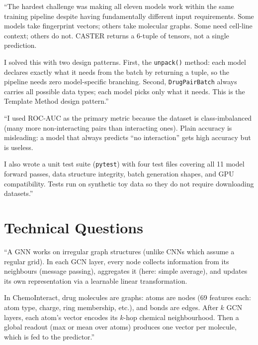 \documentclass[12pt,a4paper,oneside]{book}
\begin{document}
\begin{tcolorbox}[questionbox,title={Q2: What was your biggest technical challenge?}]
\end{tcolorbox}
\begin{tcolorbox}[answerbox]
``The hardest challenge was making all eleven models work within the same training pipeline despite having fundamentally different input requirements. Some models take fingerprint vectors; others take molecular graphs. Some need cell-line context; others do not. CASTER returns a 6-tuple of tensors, not a single prediction.

I solved this with two design patterns. First, the \texttt{unpack()} method: each model declares exactly what it needs from the batch by returning a tuple, so the pipeline needs zero model-specific branching. Second, \texttt{DrugPairBatch} always carries all possible data types; each model picks only what it needs. This is the Template Method design pattern.''
\end{tcolorbox}

\begin{tcolorbox}[questionbox,title={Q3: How did you validate your results?}]
\end{tcolorbox}
\begin{tcolorbox}[answerbox]
``I used ROC-AUC as the primary metric because the dataset is class-imbalanced (many more non-interacting pairs than interacting ones). Plain accuracy is misleading: a model that always predicts ``no interaction'' gets high accuracy but is useless.

I also wrote a unit test suite (\texttt{pytest}) with four test files covering all 11 model forward passes, data structure integrity, batch generation shapes, and GPU compatibility. Tests run on synthetic toy data so they do not require downloading datasets.''
\end{tcolorbox}

\section{Technical Questions}

\begin{tcolorbox}[questionbox,title={Q4: What is a Graph Neural Network? Explain with your project.}]
\end{tcolorbox}
\begin{tcolorbox}[answerbox]
``A GNN works on irregular graph structures (unlike CNNs which assume a regular grid). In each GCN layer, every node collects information from its neighbours (message passing), aggregates it (here: simple average), and updates its own representation via a learnable linear transformation.

In ChemoInteract, drug molecules are graphs: atoms are nodes (69 features each: atom type, charge, ring membership, etc.), and bonds are edges. After $k$ GCN layers, each atom's vector encodes its $k$-hop chemical neighbourhood. Then a global readout (max or mean over atoms) produces one vector per molecule, which is fed to the predictor.''
\end{tcolorbox}
\end{document}
